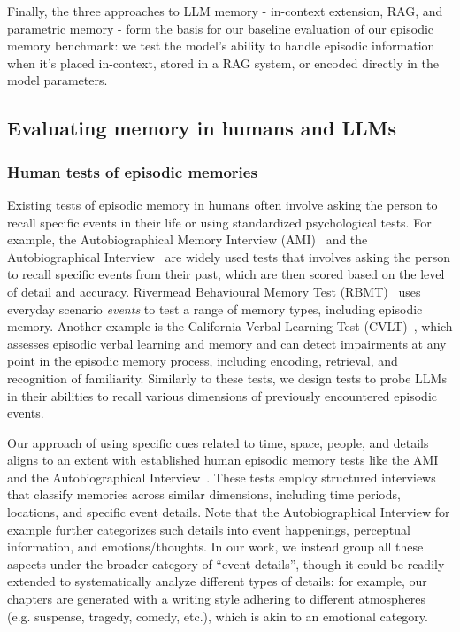 \documentclass{article}
\begin{document}
Finally, the three approaches to LLM memory - in-context extension, RAG, and parametric memory - form the basis for our baseline evaluation of our episodic memory benchmark: we test the model's ability to handle episodic information when it's placed in-context, stored in a RAG system, or encoded directly in the model parameters.


\subsection{Evaluating memory in humans and LLMs}\label{appx:related:this}
\subsubsection{Human tests of episodic memories} 
Existing tests of episodic memory in humans often involve asking the person to recall specific events in their life or using standardized psychological tests. For example, the Autobiographical Memory Interview (AMI)~\citep{Kopelman1994} and the Autobiographical Interview~\citep{levine2002aging} are widely used tests that involves asking the person to recall specific events from their past, which are then scored based on the level of detail and accuracy. Rivermead Behavioural Memory Test (RBMT)~\citep{Wilson1985} uses everyday scenario \textit{events} to test a range of memory types, including episodic memory. Another example is the California Verbal Learning Test (CVLT)~\citep{Delis2000}, which assesses episodic verbal learning and memory and can detect impairments at any point in the episodic memory process, including encoding, retrieval, and recognition of familiarity. Similarly to these tests, we design tests to probe LLMs in their abilities to recall various dimensions of previously encountered episodic events.

Our approach of using specific cues related to time, space, people, and details aligns to an extent with established human episodic memory tests like the AMI~\citep{Kopelman1994} and the Autobiographical Interview~\citep{levine2002aging}. These tests employ structured interviews that classify memories across similar dimensions, including time periods, locations, and specific event details. Note that the Autobiographical Interview for example further categorizes such details into event happenings, perceptual information, and emotions/thoughts. In our work, we instead group all these aspects under the broader category of ``event details'', though it could be readily extended to systematically analyze different types of details: for example, our chapters are generated with a writing style adhering to different atmospheres (e.g. suspense, tragedy, comedy, etc.), which is akin to an emotional category.
\end{document}
